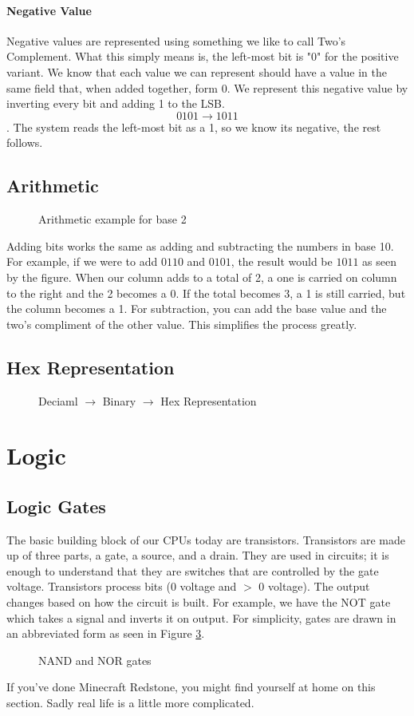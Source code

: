 \paragraph{Negative Value}
Negative values are represented using something we like to call Two's Complement. What this simply means is, the left-most bit is "0" for the positive variant. We know that each value we can represent should have a value in the same field that, when added together, form $0$. We represent this negative value by inverting every bit and adding 1 to the LSB. \[ 0101 \rightarrow 1011\]. The system reads the left-most bit as a 1, so we know its negative, the rest follows.

\subsection{Arithmetic}
\begin{figure}[!htb]
	\caption{\label{fig:adding} Arithmetic example for base 2}
\end{figure}
Adding bits works the same as adding and subtracting the numbers in base 10. For example, if we were to add $0110$ and $0101$, the result would be $1011$ as seen by the figure. When our column adds to a total of 2, a one is carried on column to the right and the 2 becomes a 0. If the total becomes 3, a 1 is still carried, but the column becomes a 1.
For subtraction, you can add the base value and the two's compliment of the other value. This simplifies the process greatly.
\newpage
\subsection{Hex Representation}
\begin{figure}[!htb]
	\caption{\label{fig:adding} Deciaml $\rightarrow$ Binary $\rightarrow$ Hex Representation}
\end{figure}
\section{Logic}
\subsection{Logic Gates}
The basic building block of our CPUs today are transistors. Transistors are made up of three parts, a gate, a source, and a drain. They are used in circuits; it is enough to understand that they are switches that are controlled by the gate voltage.
Transistors process bits (0 voltage and $>$ 0 voltage). The output changes based on how the circuit is built. For example, we have the NOT gate which takes a signal and inverts it on output. For simplicity, gates are drawn in an abbreviated form as seen in Figure \ref{fig:gates}.
\begin{figure}[!htb]
	\caption{\label{fig:gates} NAND and NOR gates}
\end{figure}
If you've done Minecraft Redstone, you might find yourself at home on this section. Sadly real life is a little more complicated.
